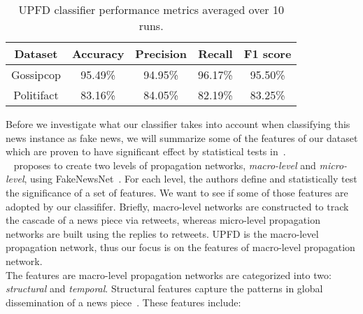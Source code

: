 \begin{table}
    \centering
    \begin{tabular}{c | c | c | c | c}
        \textbf{Dataset} & \textbf{Accuracy} & \textbf{Precision} & \textbf{Recall} & \textbf{F1 score} \\
        \hline
        Gossipcop        & 95.49\%           & 94.95\%            & 96.17\%         & 95.50\%           \\
        \hline
        Politifact       & 83.16\%           & 84.05\%            & 82.19\%         & 83.25\%           \\
    \end{tabular}
    \caption[UPFD classifier performance metrics averaged over 10 runs.]{UPFD classifier performance metrics averaged over 10 runs.}
    \label{tab:UPFDClassifier_Results}
\end{table}
Before we investigate what our classifier takes into account when classifying this news instance as fake news, we will summarize some of the features of our dataset which are proven to have significant effect by statistical tests in~\cite{HierarchicalPropagationNetworksForFND_Shu}.\\
~\cite{HierarchicalPropagationNetworksForFND_Shu} proposes to create two levels of propagation networks, \emph{macro-level} and \emph{micro-level}, using FakeNewsNet~\parencite{FakeNewsNet_Shu}. For each level, the authors define and statistically test the significance of a set of features. We want to see if some of those features are adopted by our classififer. Briefly, macro-level networks are constructed to track the cascade of a news piece via retweets, whereas micro-level propagation networks are built using the replies to retweets. UPFD is the macro-level propagation network, thus our focus is on the features of macro-level propagation network.\\
The features are macro-level propagation networks are categorized into two: \emph{structural} and \emph{temporal}. Structural features capture the patterns in global dissemination of a news piece~\parencite{HierarchicalPropagationNetworksForFND_Shu}. These features include:
